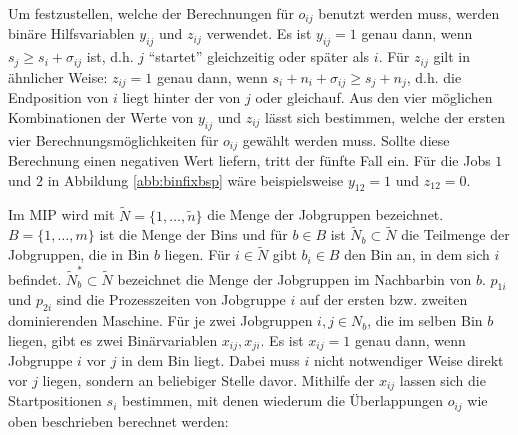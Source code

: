 \documentclass{scrreprt}
\begin{document}
Um festzustellen, welche der Berechnungen für $o_{ij}$ benutzt werden muss, werden binäre Hilfsvariablen $y_{ij}$ und $z_{ij}$ verwendet.
Es ist $y_{ij}=1$ genau dann, wenn $s_j \geq s_i + \sigma_{ij}$ ist, d.h. $j$ "`startet"' gleichzeitig oder später als $i$.
Für $z_{ij}$ gilt in ähnlicher Weise: $z_{ij}=1$ genau dann, wenn $s_i + n_i + \sigma_{ij} \geq s_j + n_j$, 
d.h. die Endposition von $i$ liegt hinter der von $j$ oder gleichauf.
Aus den vier möglichen Kombinationen der Werte von $y_{ij}$ und $z_{ij}$ lässt sich bestimmen, 
welche der ersten vier Berechnungsmöglichkeiten für $o_{ij}$ gewählt werden muss.
Sollte diese Berechnung einen negativen Wert liefern, tritt der fünfte Fall ein.
Für die Jobs $1$ und $2$ in Abbildung \ref{abb:binfixbsp} wäre beispielsweise $y_{12}=1$ und $z_{12}=0$.

Im MIP wird mit $\tilde{N}=\{1,\ldots,\tilde{n}\}$ die Menge der Jobgruppen bezeichnet.
$B=\{1,\ldots,m\}$ ist die Menge der Bins und für $b\in B$ ist $\tilde{N}_b\subset \tilde{N}$ die Teilmenge der Jobgruppen, die in Bin $b$ liegen.
Für $i\in\tilde{N}$ gibt $b_i\in B$ den Bin an, in dem sich $i$ befindet.
$\tilde{N}_b^*\subset \tilde{N}$ bezeichnet die Menge der Jobgruppen im Nachbarbin von $b$.
$p_{1i}$ und $p_{2i}$ sind die Prozesszeiten von Jobgruppe $i$ auf der ersten bzw. zweiten dominierenden Maschine.
Für je zwei Jobgruppen $i,j\in N_b$, die im selben Bin $b$ liegen, gibt es
zwei Binärvariablen $x_{ij},x_{ji}$. Es ist $x_{ij}=1$ genau dann, wenn 
Jobgruppe $i$ vor $j$ in dem Bin liegt. Dabei muss $i$ nicht notwendiger
Weise direkt vor $j$ liegen, sondern an beliebiger Stelle davor.
Mithilfe der $x_{ij}$ lassen sich die Startpositionen $s_i$ bestimmen, mit denen wiederum die Überlappungen $o_{ij}$ wie oben beschrieben berechnet werden:
\end{document}
